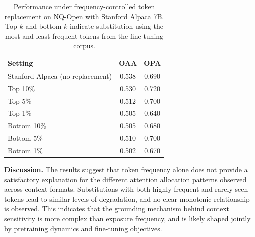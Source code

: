 \documentclass{article} %
\begin{document}
\begin{table}[h]
\centering
\caption{Performance under frequency-controlled token replacement on NQ-Open with Stanford Alpaca 7B. Top-$k$ and bottom-$k$ indicate substitution using the most and least frequent tokens from the fine-tuning corpus.}
\label{tab:freq_replacement}
\begin{tabular}{lcc}
\toprule
\textbf{Setting} & \textbf{OAA} & \textbf{OPA} \\
\midrule\midrule
Stanford Alpaca (no replacement) & 0.538 & 0.690 \\
\midrule
Top 10\%   & 0.530 & 0.720 \\
Top 5\%    & 0.512 & 0.700 \\
Top 1\%    & 0.505 & 0.640 \\
\midrule
Bottom 10\% & 0.505 & 0.680 \\
Bottom 5\%  & 0.510 & 0.700 \\
Bottom 1\%  & 0.502 & 0.670 \\
\bottomrule
\end{tabular}
\end{table}

\textbf{Discussion.}
The results suggest that token frequency alone does not provide a satisfactory explanation for the different attention allocation patterns observed across context formats. Substitutions with both highly frequent and rarely seen tokens lead to similar levels of degradation, and no clear monotonic relationship is observed. This indicates that the grounding mechanism behind context sensitivity is more complex than exposure frequency, and is likely shaped jointly by pretraining dynamics and fine-tuning objectives.
\end{document}
